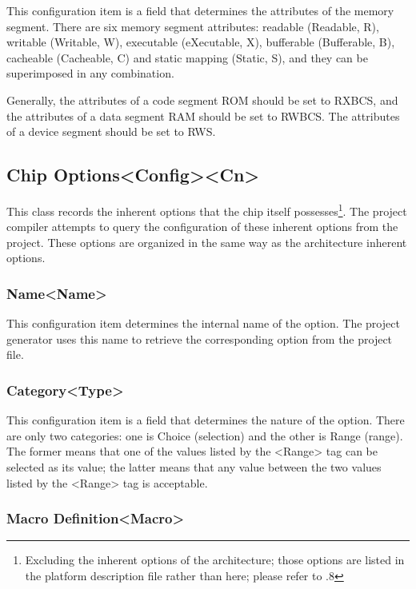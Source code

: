 This configuration item is a field that determines the attributes of the memory segment. There are six memory segment attributes: readable (Readable, R), writable (Writable, W), executable (eXecutable, X), bufferable (Bufferable, B), cacheable (Cacheable, C) and static mapping (Static, S), and they can be superimposed in any combination.

Generally, the attributes of a code segment ROM should be set to RXBCS, and the attributes of a data segment RAM should be set to RWBCS. The attributes of a device segment should be set to RWS.

\subsection{Chip Options<Config><Cn>{}}\label{subsec:5-5-13}

This class records the inherent options that the chip itself possesses\footnote{Excluding the inherent options of the architecture; those options are listed in the platform description file rather than here; please refer to .8}. The project compiler attempts to query the configuration of these inherent options from the project. These options are organized in the same way as the architecture inherent options.

\subsubsection{Name<Name>{}}\label{subsubsec:5-5-13-1}

This configuration item determines the internal name of the option. The project generator uses this name to retrieve the corresponding option from the project file.

\subsubsection{Category<Type>{}}\label{subsubsec:5-5-13-2}

This configuration item is a field that determines the nature of the option. There are only two categories: one is Choice (selection) and the other is Range (range). The former means that one of the values listed by the <Range> tag can be selected as its value; the latter means that any value between the two values listed by the <Range> tag is acceptable.

\subsubsection{Macro Definition<Macro>{}}\label{subsubsec:5-5-13-3}

